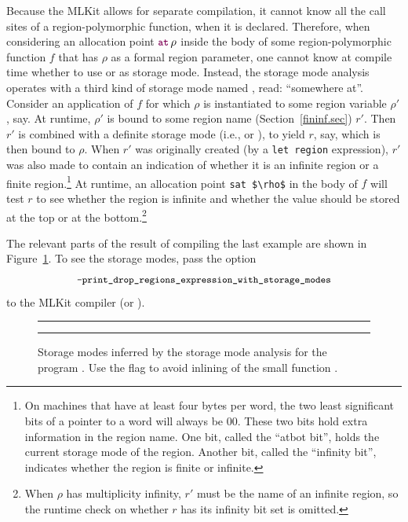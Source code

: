 \documentclass[12pt]{book}
\begin{document}
Because the MLKit allows for separate compilation, it cannot know all the call
sites of a region-polymorphic function, when it is declared.  Therefore, when
considering an allocation point $\fw{at}\,\rho$ inside the body of some
region-polymorphic function $f$ that has $\rho$ as a formal region parameter,
one cannot know at compile time whether to use  or  as
storage mode.  Instead, the storage mode analysis operates with a third kind of
storage mode named , read: ``somewhere at''. Consider an application of
$f$ for which $\rho$ is instantiated to some region variable $\rho'$, say. At
runtime, $\rho'$ is bound to some region name (Section~\ref{fininf.sec}) $r'$.
Then $r'$ is combined with a definite storage mode (i.e.,  or
), to yield $r$, say, which is then bound to $\rho$.  When $r'$ was
originally created (by a
%
\lstinline{let region}%
%
expression), $r'$ was also made to contain an indication of whether it is an
infinite region or a finite region.\footnote{On machines\label{atbit.lab} that
have at least four bytes per word, the two least significant bits of a pointer
to a word will always be 00. These two bits hold extra information in the
%
%
%
region name.  One bit, called the ``atbot bit'', holds the current storage mode
of the region. Another bit, called the ``infinity bit'', indicates whether the
region is finite or infinite.}  At runtime, an allocation point
%
\lstinline!sat $\rho$!%
%
in the body of $f$ will test $r$ to see whether the region is infinite and
whether the value should be stored at the top or at the bottom.\footnote{When
$\rho$ has multiplicity infinity, $r'$ must be the name of an infinite region,
so the runtime check on whether $r$ has its infinity bit set is omitted.}

The relevant parts of the result of compiling the last example are shown in
Figure~\ref{sma1.fig}.  To see the storage modes, pass the option
%
%
%
$$\mbox{\small\ttfamily-print\_drop\_regions\_expression\_with\_storage\_modes}$$ to the MLKit
  compiler (or ).

\begin{figure}
\hrule
\medskip
{}
\caption{Storage modes inferred by the storage mode analysis for the program
  . Use the flag  to avoid inlining of
  the small function .}
\label{sma1.fig}
\medskip
\hrule
\end{figure}
\end{document}
